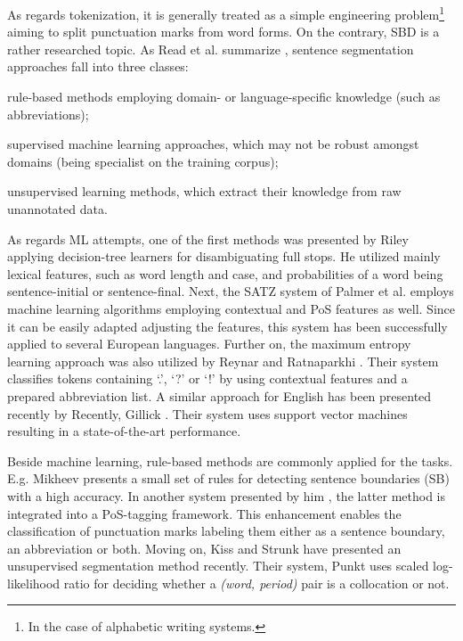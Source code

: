 As regards tokenization, it is generally treated as a simple engineering problem\footnote{In the case of alphabetic writing systems.} aiming to split punctuation marks from word forms. On the contrary, SBD is a rather researched topic. As Read et al. summarize \cite{read2012sentence}, sentence segmentation approaches fall into three classes: 
\begin{inparaenum}[\itshape 1\upshape)]
 \item rule-based methods employing domain- or language-specific knowledge (such as abbreviations); 
 \item supervised machine learning approaches, which may not be robust amongst domains (being specialist on the training corpus); 
 \item unsupervised learning methods, which extract their knowledge from raw unannotated data. 
\end{inparaenum}

As regards ML attempts, one of the first methods was presented by Riley \cite{riley1989some} applying decision-tree learners for disambiguating full stops. He utilized mainly lexical features, such as word length and case, and probabilities of a word being sentence-initial or sentence-final. 
Next, the SATZ system of Palmer et al. \cite{palmer1997adaptive} employs machine learning algorithms employing contextual and PoS features as well. 
Since it can be easily adapted adjusting the features, this system has been successfully applied \cite{palmer1997adaptive} to several European languages. 
Further on, the maximum entropy learning approach was also utilized by Reynar and Ratnaparkhi \cite{reynar1997maximum}. 
Their system classifies tokens containing `.', `?' or `!' by using contextual features and a prepared abbreviation list. A similar approach for English has been presented recently by
Recently, Gillick \cite{gillick2009sentence}. Their system uses support vector machines resulting in a state-of-the-art performance.

Beside machine learning, rule-based methods are commonly applied for the tasks. E.g. Mikheev presents \cite{mikheev2002periods} a small set of rules for detecting sentence boundaries (SB) with a high accuracy. 
In another system presented by him \cite{mikheev2000tagging}, the latter method is integrated into a PoS-tagging framework. This enhancement enables the classification of punctuation marks labeling them either as a sentence boundary, an abbreviation or both. 
Moving on, Kiss and Strunk have presented an unsupervised segmentation method recently. 
Their system, Punkt \cite{kiss2006unsupervised} uses scaled log-likelihood ratio for deciding whether a \emph{(word, period)} pair is a collocation or not.

